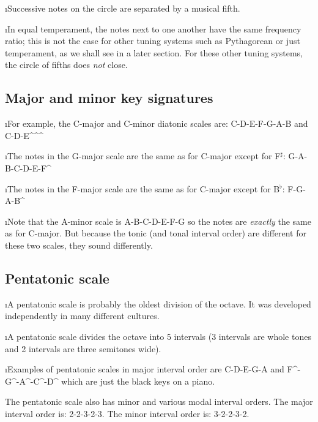 \i Successive notes on the circle are separated by a musical fifth.

\i In equal temperament, the notes next to one another have the 
same frequency ratio; 
this is not the case for other tuning systems such as Pythagorean
or just temperament, as we shall see in a later
section.
For these other tuning systems, the circle of fifths does {\em not}
close.

\ei
\subsection{Major and minor key signatures}
\bi

\i For example, the C-major and C-minor diatonic scales are:
\be
{\rm C-D-E-F-G-A-B}
\nonumber
\ee
% 
and
%
\be
{\rm C-D-E}^^^\sharp
\nonumber
\ee

\i The notes in the G-major scale are the same as for C-major 
except for F$^\sharp$:
%
\be
{\rm G-A-B-C-D-E-F}^\sharp
\nonumber
\ee
% 

\i The notes in the F-major scale are the same as for C-major 
except for B$^\flat$:
%
\be
{\rm F-G-A-B}^
\nonumber
\ee
% 

\i Note that the A-minor scale is
%
\be
{\rm A-B-C-D-E-F-G}
\nonumber
\ee
% 
so the notes are {\em exactly} the same as for C-major.
But because the tonic (and tonal interval order) are 
different for these two scales, they sound differently.

\ei
\subsection{Pentatonic scale}
\bi

\i A pentatonic scale is probably the oldest 
division of the octave.
It was developed independently in many different cultures.

\i A pentatonic scale divides the octave into
5 intervals (3 intervals are whole tones and
2 intervals are three semitones wide).

\i Examples of pentatonic scales in major interval
order are
%
\be
{\rm C-D-E-G-A} 
\ee
%
and
%
\be
{\rm F{}^\sharp-G{}^\sharp-A{}^\sharp-C{}^\sharp-D{}^\sharp}
\ee
%
which are just the black keys on a piano.

\item
The pentatonic scale also has minor
and various modal interval orders.
The major interval order is: 2-2-3-2-3.
The minor interval order is: 3-2-2-3-2.

